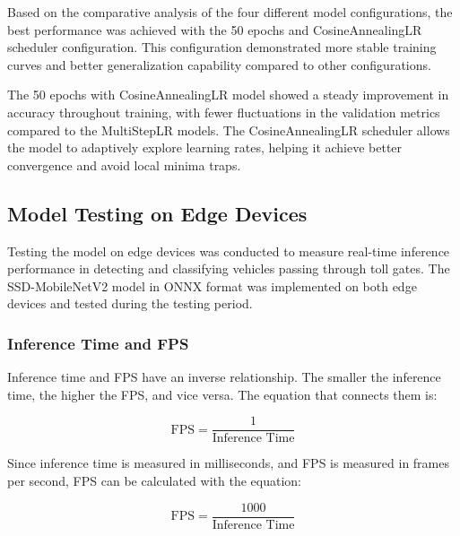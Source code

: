 Based on the comparative analysis of the four different model configurations, the best performance was achieved with the 50 epochs and CosineAnnealingLR scheduler configuration. This configuration demonstrated more stable training curves and better generalization capability compared to other configurations.

The 50 epochs with CosineAnnealingLR model showed a steady improvement in accuracy throughout training, with fewer fluctuations in the validation metrics compared to the MultiStepLR models. The CosineAnnealingLR scheduler allows the model to adaptively explore learning rates, helping it achieve better convergence and avoid local minima traps.


\subsection{Model Testing on Edge Devices}
\label{sec:experiment1}

Testing the model on edge devices was conducted to measure real-time inference performance in detecting and classifying vehicles passing through toll gates. The SSD-MobileNetV2 model in ONNX format was implemented on both edge devices and tested during the testing period.

\subsubsection{Inference Time and FPS}

Inference time and FPS have an inverse relationship. The smaller the inference time, the higher the FPS, and vice versa. The equation that connects them is:

\begin{equation}
  \mbox{FPS} = \frac{1}{\mbox{Inference Time}}
\end{equation}

Since inference time is measured in milliseconds, and FPS is measured in frames per second, FPS can be calculated with the equation:

\begin{equation}
  \mbox{FPS} = \frac{1000}{\mbox{Inference Time}}
\end{equation}

